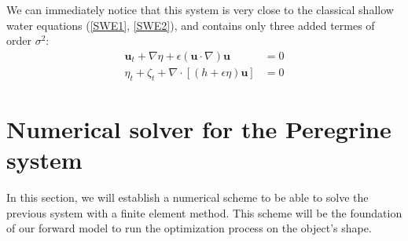 \documentclass[11pt,a4paper]{article}
\begin{document}
	We can immediately notice that this system is very close to the classical shallow water equations (\eqref{SWE1}, \eqref{SWE2}), and contains only three added termes of order $\sigma^2$:
	\begin{align}
		\mathbf{u}_t + \nabla\eta + \epsilon (\mathbf{u} \cdot \nabla) \mathbf{u} &= 0 \label{SWE1}\\
		\eta_t + \zeta_t + \nabla \cdot [(h+\epsilon \eta) \mathbf{u}] &= 0 \label{SWE2}
	\end{align}	
			
	\pagebreak
			
\section{Numerical solver for the Peregrine system}	
	In this section, we will establish a numerical scheme to be able to solve the previous system with a finite element method. This scheme will be the foundation of our forward model to run the optimization process on the object's shape.
	
\end{document}
